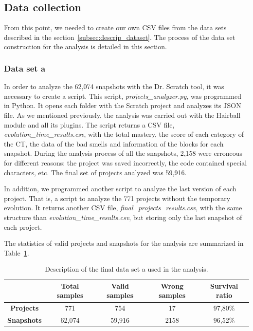 \subsection{Data collection}
\label{subsec:datacollection}

From this point, we needed to create our own CSV files from the data sets described in the section~\ref{subsec:descrip_dataset}. The process of the data set construction for the analysis is detailed in this section.

\subsubsection{Data set a}
\label{subsubsec:datacollection_a}

In order to analyze the 62,074 snapshots with the Dr. Scratch tool, it was necessary to create a script. This script, \textit{projects\_analyzer.py}, was programmed in Python. It opens each folder with the Scratch project and analyzes its JSON file. As we mentioned previously, the analysis was carried out with the Hairball module and all its plugins. The script returns a CSV file, \textit{evolution\_time\_results.csv}, with the total mastery, the score of each category of the CT, the data of the bad smells and information of the blocks for each snapshot. During the analysis process of all the snapshots, 2,158 were erroneous for different reasons: the project was saved incorrectly, the code contained special characters, etc. The final set of projects analyzed was 59,916.

In addition, we programmed another script to analyze the last version of each project. That is, a script to analyze the 771 projects without the temporary evolution. It returns another CSV file, \textit{final\_projects\_results.csv}, with the same structure than \textit{evolution\_time\_results.csv}, but storing only the last snapshot of each project. 

The statistics of valid projects and snapshots for the analysis are summarized in Table~\ref{table:datacollection_a}.

\begin{table}
 \begin{center}
  \begin{tabular}{|c|c|c|c|c|}
    \hline
     & \textbf{Total samples} & \textbf{Valid samples} & \textbf{Wrong samples} & \textbf{Survival ratio} \\ \hline
    \textbf{Projects} & 771 & 754 & 17 & 97,80\% \\ \hline
    \textbf{Snapshots}& 62,074 & 59,916 & 2158 & 96,52\% \\ \hline
  \end{tabular}
  \caption{Description of the final data set a used in the analysis.}
  \label{table:datacollection_a}
 \end{center}
\end{table}


